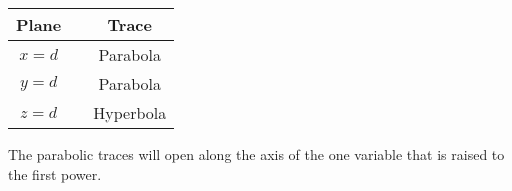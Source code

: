 \noindent
\begin{minipage}{1.1\linewidth}
\noindent%
\begin{minipage}[t]{.4\linewidth}
\vskip0pt
\end{minipage}
\begin{minipage}[t]{.4\linewidth}
\vskip0pt
\begin{tabular}[]{ccc}
\textbf{Plane}  & & \textbf{Trace} \\ \hline
$x=d$ & & Parabola\\
$y=d$ & & Parabola\\
$z=d$ & & Hyperbola
\end{tabular}
\end{minipage}%
\baselineskip
\noindent
\begin{minipage}[t]{.4\linewidth}
\vskip0pt
\end{minipage}
\begin{minipage}[t]{.4\linewidth}
\vskip0pt
\end{minipage}

\baselineskip
\begin{minipage}[t]{.75\linewidth}
The parabolic traces will open along the axis of the one variable that is raised to the first power.

\end{minipage}
\end{minipage}

\restoregeometry
\regularheader
\clearpage

